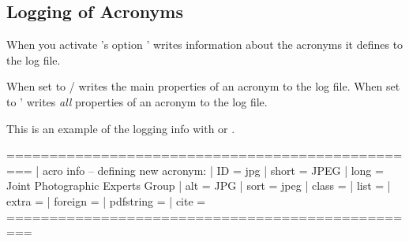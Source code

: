 \documentclass[load-preamble+]{cnltx-doc}
\begin{document}
\subsection{Logging of Acronyms}
When you activate \acro's option  \acro' writes
information about the acronyms it defines to the log file.
\begin{options}
    When set to / \acro{} writes the main properties
    of an acronym to the log file.  When set to  \acro' writes
    \emph{all}  properties of an acronym to the log file.
\end{options}

This is an example of the logging info with  or
.
\begin{sourcecode}
  =================================================
  | acro info -- defining new acronym:
  |   ID = {jpg}
  |   short = {JPEG}
  |   long = {Joint Photographic Experts Group}
  |   alt = {JPG}
  |   sort = {jpeg}
  |   class = {}
  |   list = {}
  |   extra = {}
  |   foreign = {}
  |   pdfstring = {}
  |   cite = {}
  =================================================
\end{sourcecode}
\end{document}
